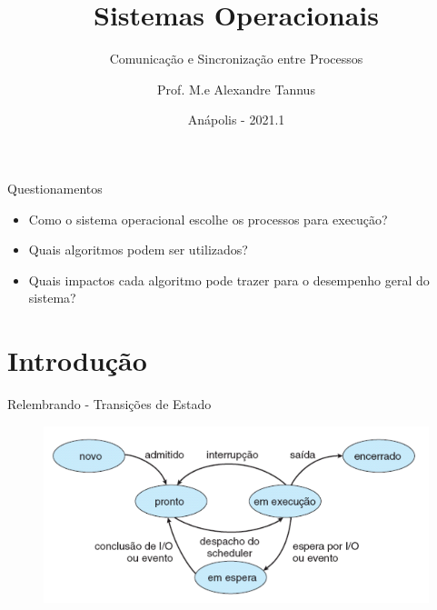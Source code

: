 \documentclass[aspectratio=169,
				xcolor=table]{beamer}
\institute[]{\uppercase{Engenharia de Software}}
\title[]{Sistemas Operacionais}
\subtitle[]{Comunicação e Sincronização entre Processos }
\author[]{Prof. M.e Alexandre Tannus}
\date{Anápolis - 2021.1}
\begin{document}
	\begin{frame}
		\titlepage
	\end{frame}

	\begin{frame}
		\tableofcontents
	\end{frame}	
	
	
	\begin{frame}{Questionamentos}
		\begin{itemize}
			\item Como o sistema operacional escolhe os processos para execução?
			\vspace{1em}
			\item Quais algoritmos podem ser utilizados?
			\vspace{1em}
			\item Quais impactos cada algoritmo pode trazer para o desempenho geral do sistema?
		\end{itemize}
	\end{frame}

	\section{Introdução}
	\begin{frame}{Relembrando - Transições de Estado}		
		\begin{figure}[hbtp]
			\centering
			\includegraphics[keepaspectratio, width=.9\textwidth]{../figs/cap03/estados.png}	
		\end{figure} 
	\end{frame}	
	
\end{document}
